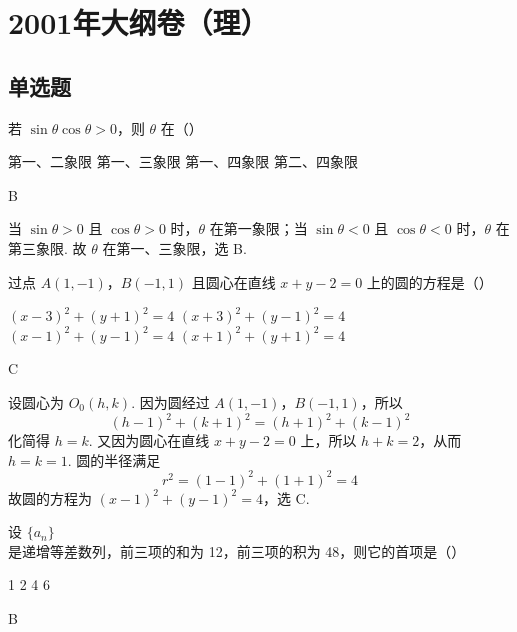 \chapter{2001年大纲卷（理）}
\section{单选题}
\begin{problem}
若 \(\sin \theta \cos \theta > 0\)，则 \(\theta\) 在（\quad）

\choices
    {第一、二象限}
    {第一、三象限}
    {第一、四象限}
    {第二、四象限}
\end{problem}

\begin{answer}
B
\end{answer}

\begin{solution}
当 \(\sin\theta>0\) 且 \(\cos\theta>0\) 时，\(\theta\) 在第一象限；当 \(\sin\theta<0\) 且 \(\cos\theta<0\) 时，\(\theta\) 在第三象限. 故 \(\theta\) 在第一、三象限，选 B.
\end{solution}

\begin{problem}
过点 \(A(1, -1)\)，\(B(-1, 1)\) 且圆心在直线 \(x + y - 2 = 0\) 上的圆的方程是（\quad）

\choices
    {\((x - 3)^2 + (y + 1)^2 = 4\)}
    {\((x + 3)^{2} + (y - 1)^{2} = 4\)}
    {\((x - 1)^{2} + (y - 1)^{2} = 4\)}
    {\((x + 1)^{2} + (y + 1)^{2} = 4\)}
\end{problem}

\begin{answer}
C
\end{answer}

\begin{solution}
设圆心为 \(O_0(h,k)\). 因为圆经过 \(A(1,-1)\)，\(B(-1,1)\)，所以
\[
(h-1)^2+(k+1)^2=(h+1)^2+(k-1)^2
\]
化简得 \(h=k\). 又因为圆心在直线 \(x+y-2=0\) 上，所以 \(h+k=2\)，从而 \(h=k=1\). 圆的半径满足
\[
r^2=(1-1)^2+(1+1)^2=4
\]
故圆的方程为 \((x-1)^2+(y-1)^2=4\)，选 C.
\end{solution}

\begin{problem}
设 \(\{a_{n}\}\) 是递增等差数列，前三项的和为 12，前三项的积为 48，则它的首项是（\quad）

\choices
    {1}
    {2}
    {4}
    {6}
\end{problem}

\begin{answer}
B
\end{answer}

